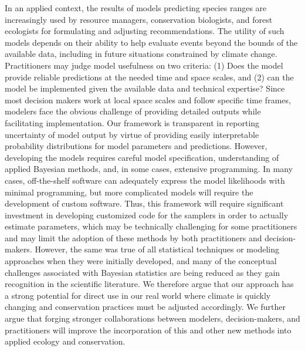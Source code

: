 \documentclass[11pt]{article}
\begin{document}
In an applied context, the results of models predicting species ranges are increasingly used by resource managers, conservation biologists, and forest ecologists for formulating and adjusting recommendations. 
The utility of such models depends on their ability to help evaluate events beyond the bounds of the available data, including in future situations constrained by climate change. 
Practitioners may judge model usefulness on two criteria: (1) Does the model provide reliable predictions at the needed time and space scales, and (2) can the model be implemented given the available data and technical expertise? 
Since most decision makers work at local space scales and follow specific time frames, modelers face the obvious challenge of providing detailed outputs while facilitating implementation.
Our framework is transparent in reporting uncertainty of model output by virtue of providing easily interpretable probability distributions for model parameters and predictions.
However, developing the models requires careful model specification, understanding of applied Bayesian methods, and, in some cases, extensive programming.
In many cases, off-the-shelf software can adequately express the model likelihoods with minimal programming, but more complicated models will require the development of custom software.
Thus, this framework will require significant investment in developing customized code for the samplers in order to actually estimate parameters, which may be technically challenging for some practitioners and may limit the adoption of these methods by both practitioners and decision-makers.
However, the same was true of all statistical techniques or modeling approaches when they were initially developed, and many of the conceptual challenges associated with Bayesian statistics are being reduced as they gain recognition in the scientific literature. 
We therefore argue that our approach has a strong potential for direct use in our real world where climate is quickly changing and conservation practices must be adjusted accordingly.
We further argue that forging stronger collaborations between modelers, decision-makers, and practitioners will improve the incorporation of this and other new methods into applied ecology and conservation.


\end{document}
